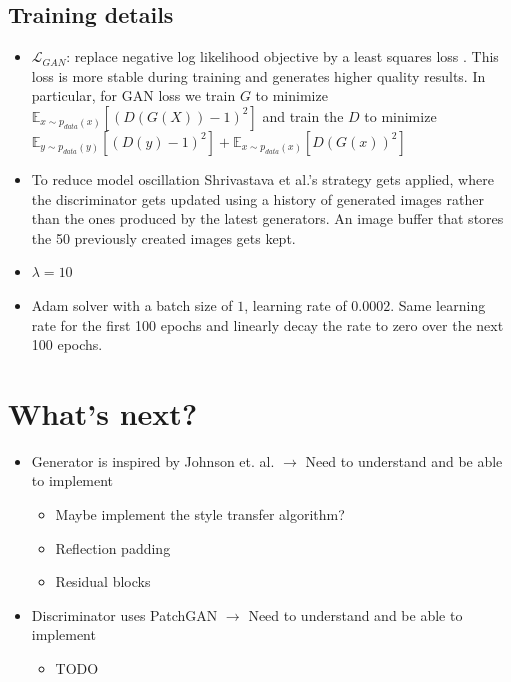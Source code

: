 \documentclass{scrartcl}
\begin{document}
\subsection*{Training details}
\begin{itemize}
	\item
		$\mathcal{L}_{GAN}$: replace negative log likelihood objective by a least squares loss \cite{DBLP:journals/corr/MaoLXLW16}. This loss is more stable during training and generates higher quality results. In particular, for GAN loss we train $G$ to minimize $\mathbb{E}_{x \sim p_{data}(x)} [(D(G(X)) - 1)^2]$ and train the $D$ to minimize $\mathbb{E}_{y \sim p_{data}(y)}[(D(y) - 1)^2] + \mathbb{E}_{x \sim p_{data}(x)}[D(G(x))^2]$
	\item
		To reduce model oscillation Shrivastava et al.'s \cite{DBLP:journals/corr/ShrivastavaPTSW16} strategy gets applied, where the discriminator gets updated using a history of generated images rather than the ones produced by the latest generators. An image buffer that stores the 50 previously created images gets kept.
	\item
		$\lambda = 10$ 
	\item
		Adam solver with a batch size of $1$, learning rate of $0.0002$. Same learning rate for the first 100 epochs and linearly decay the rate to zero over the next 100 epochs.
\end{itemize}

\section*{What's next?}
\begin{itemize}
	\item
		Generator is inspired by Johnson et. al. $\rightarrow$ Need to understand and be able to implement
		\begin{itemize}
			\item
				Maybe implement the style transfer algorithm?
			\item
				Reflection padding
			\item
				Residual blocks
		\end{itemize}
	\item
		Discriminator uses PatchGAN $\rightarrow$ Need to understand and be able to implement
		\begin{itemize}
			\item
				TODO
		\end{itemize}
\end{itemize}
\newpage


\end{document}

